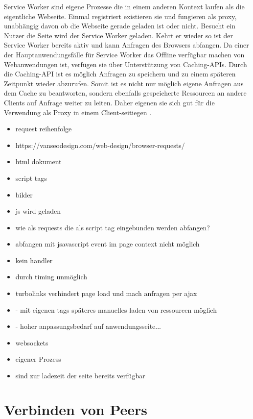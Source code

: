 Service Worker sind eigene Prozesse die in einem anderen Kontext laufen als die eigentliche Webseite. Einmal registriert existieren sie und fungieren als proxy, unabhängig davon ob die Webseite gerade geladen ist oder nicht. Besucht ein Nutzer die Seite wird der Service Worker geladen. Kehrt er wieder so ist der Service Worker bereits aktiv und kann Anfragen des Browsers abfangen. Da einer der Hauptanwendungsfälle für Service Worker das Offline verfügbar machen von Webanwendungen ist, verfügen sie über Unterstützung von Caching-APIs. Durch die Caching-API ist es möglich Anfragen zu speichern und zu einem späteren Zeitpunkt wieder abzurufen. Somit ist es nicht nur möglich eigene Anfragen aus dem Cache zu beantworten, sondern ebenfalls gespeicherte Ressourcen an andere Clients auf Anfrage weiter zu leiten. Daher eigenen sie sich gut für die Verwendung als Proxy in einem Client-seitiegen \cdn.   

\begin{itemize}
	\item request reihenfolge
	\item https://vanseodesign.com/web-design/browser-requests/
	\item html dokument
	\item script tags
	\item bilder
	\item js wird geladen
	\item wie als requests die als script tag eingebunden werden abfangen?
	\item abfangen mit jsavascript event im page context nicht möglich
	\item kein handler
	\item durch timing unmöglich
	\item turbolinks verhindert page load und mach anfragen per ajax
	\item - mit eigenen tags späteres manuelles laden von ressourcen möglich
	\item - hoher anpassungsbedarf auf anwendungsseite...
	\item websockets
	\item eigener Prozess
	\item sind zur ladezeit der seite bereits verfügbar
\end{itemize}

\section{Verbinden von Peers}


